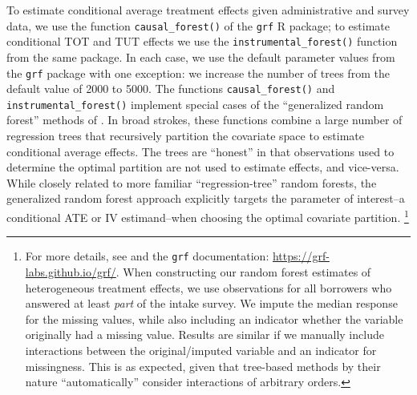 \documentclass[11pt, a4paper]{article}
\begin{document}
To estimate conditional average treatment effects given administrative and survey data, we use the function \texttt{causal\_forest()} of the \texttt{grf} R package; to estimate conditional TOT and TUT effects we use the \texttt{instrumental\_forest()} function from the same package.
In each case, we use the default parameter values from the \texttt{grf} package with one exception: we increase the number of trees from the default value of 2000 to 5000.
The functions \texttt{causal\_forest()} and \texttt{instrumental\_forest()} implement special cases of the ``generalized random forest'' methods of \cite{atheygrf}.
In broad strokes, these functions combine a large number of regression trees that recursively partition the covariate space to estimate conditional average effects.
The trees are ``honest'' in that observations used to determine the optimal partition are not used to estimate effects, and vice-versa.
While closely related to more familiar ``regression-tree'' random forests, the generalized random forest approach explicitly targets the parameter of interest--a conditional ATE or IV estimand--when choosing the optimal covariate partition.
\footnote{For more details, see \cite{atheygrf} and the \texttt{grf} documentation: \url{https://grf-labs.github.io/grf/}. When constructing our random forest estimates of heterogeneous treatment effects, we use observations for all borrowers who answered at least \emph{part} of the intake survey.
We impute the median response for the missing values, while also including an indicator whether the variable originally had a missing value. Results are similar if we manually include interactions between the original/imputed variable and an indicator for missingness. This is as expected, given that tree-based methods by their nature ``automatically'' consider interactions of arbitrary orders.}
\end{document}
